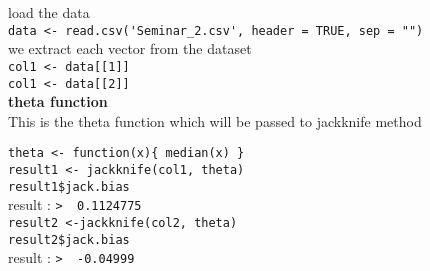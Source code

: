 \documentclass{article}[12pt]
\begin{document}
\begin{enumerate}
load the data\\

\verb|data <- read.csv('Seminar_2.csv', header = TRUE, sep = "")|\\

we extract each vector from the dataset\\

\verb|col1 <- data[[1]]|\\
\verb|col1 <- data[[2]]|\\
{\bf theta function}\\
This is the theta function  which will be passed to jackknife method

\verb|theta <- function(x){ median(x) }|\\

\verb|result1 <- jackknife(col1, theta)|\\
\verb|result1$jack.bias|\\
result : \verb|>  0.1124775|\\

\verb|result2 <-jackknife(col2, theta)|\\
\verb|result2$jack.bias|\\
result : \verb|>  -0.04999|

\end{enumerate}





\end{document}
